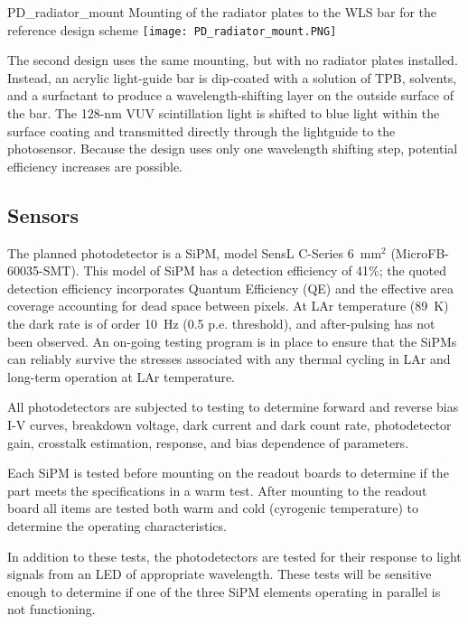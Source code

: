 \begin{cdrfigure}{PD_radiator_mount}
  {Mounting of the radiator plates to the WLS bar for the reference design scheme}
\texttt{[image: PD\_radiator\_mount.PNG]}
\end{cdrfigure}

The second design uses the same mounting, but with no radiator plates installed.  
Instead, an acrylic light-guide bar is dip-coated  with a solution
of TPB, solvents, and a surfactant to produce a wavelength-shifting layer on the
outside surface of the bar.
The 128-nm VUV scintillation light is shifted to blue light within the surface coating and transmitted directly
through the lightguide to the photosensor. Because the design uses only one wavelength shifting step, potential efficiency increases are possible.


\subsection{Sensors}

The planned photodetector is a SiPM, model 
SensL C-Series 6~mm$^2$
(MicroFB-60035-SMT). %
This model of SiPM has a detection efficiency of
41\%; the quoted detection efficiency incorporates Quantum Efficiency (QE) and 
the effective area
  coverage accounting for dead space between pixels.   At LAr temperature (89~K) the dark rate is of order 10~Hz
(0.5 p.e. threshold), and  after-pulsing has not been observed. An on-going testing program is in place to ensure 
that the SiPMs can reliably survive the stresses associated with 
any thermal cycling in LAr and long-term operation at LAr temperature.

All photodetectors %
are subjected to testing to determine
 forward and reverse bias I-V curves,
 breakdown voltage, dark current and dark count rate, photodetector gain, crosstalk estimation, response, and bias dependence of parameters.
 
Each SiPM is tested before mounting on the readout boards to determine
if the part meets the specifications in a warm test.  After mounting to
the readout board all items are tested both warm and cold (cyrogenic 
temperature) to determine the operating characteristics.

In addition to these tests, the photodetectors are tested for their
response to light signals from an LED of appropriate wavelength.
These tests will be sensitive enough to determine if one of the three SiPM
elements operating in parallel is not functioning.


